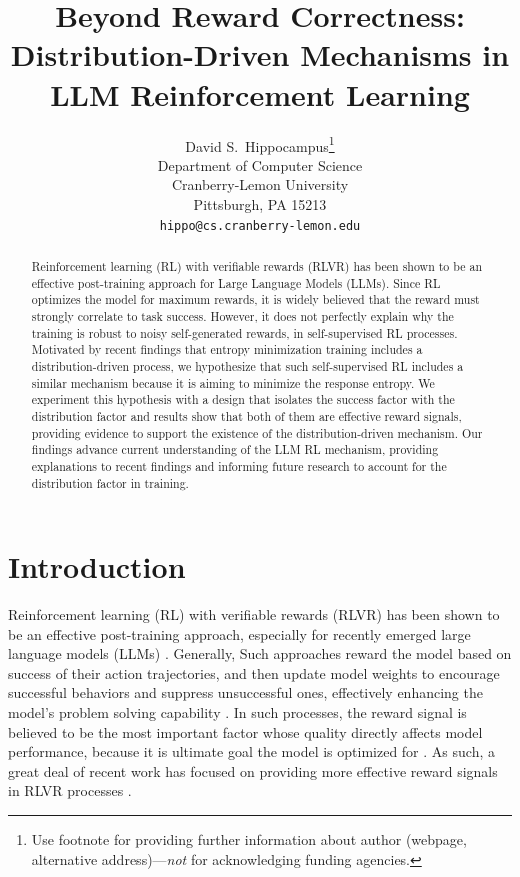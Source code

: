 \documentclass{article}
\title{Beyond Reward Correctness: Distribution-Driven Mechanisms in LLM Reinforcement Learning}
\author{%
  David S.~Hippocampus\thanks{Use footnote for providing further information
    about author (webpage, alternative address)---\emph{not} for acknowledging
    funding agencies.} \\
  Department of Computer Science\\
  Cranberry-Lemon University\\
  Pittsburgh, PA 15213 \\
  \texttt{hippo@cs.cranberry-lemon.edu} \\
}
\begin{document}
\maketitle


\begin{abstract}
Reinforcement learning (RL) with verifiable rewards (RLVR) has been shown to be an effective post-training approach for Large Language Models (LLMs). Since RL optimizes the model for maximum rewards, it is widely believed that the reward must strongly correlate to task success. However, it does not perfectly explain why the training is robust to noisy self-generated rewards, in self-supervised RL processes. Motivated by recent findings that entropy minimization training includes a distribution-driven process, we hypothesize that such self-supervised RL includes a similar mechanism because it is aiming to minimize the response entropy. We experiment this hypothesis with a design that isolates the success factor with the distribution factor and results show that both of them are effective reward signals, providing evidence to support the existence of the distribution-driven mechanism. Our findings advance current understanding of the LLM RL mechanism, providing explanations to recent findings and informing future research to account for the distribution factor in training.

\end{abstract}

\section{Introduction}

Reinforcement learning (RL) with verifiable rewards (RLVR) has been shown to be an effective post-training approach, especially for recently emerged large language models (LLMs) \cite{guo2025deepseek,zhang2025survey}. Generally, Such approaches reward the model based on success of their action trajectories, and then update model weights to encourage successful behaviors and suppress unsuccessful ones, effectively enhancing the model's problem solving capability \cite{guo2025deepseek,littman2015reinforcement,mnih2015human,silver2016mastering}. In such processes, the reward signal is believed to be the most important factor whose quality directly affects model performance, because it is ultimate goal the model is optimized for \cite{kaelbling1996reinforcement,sutton1998reinforcement}. As such, a great deal of recent work has focused on providing more effective reward signals in RLVR processes \cite{she2025r,wang2024math,yuanfree,guosegment}. 
\end{document}
